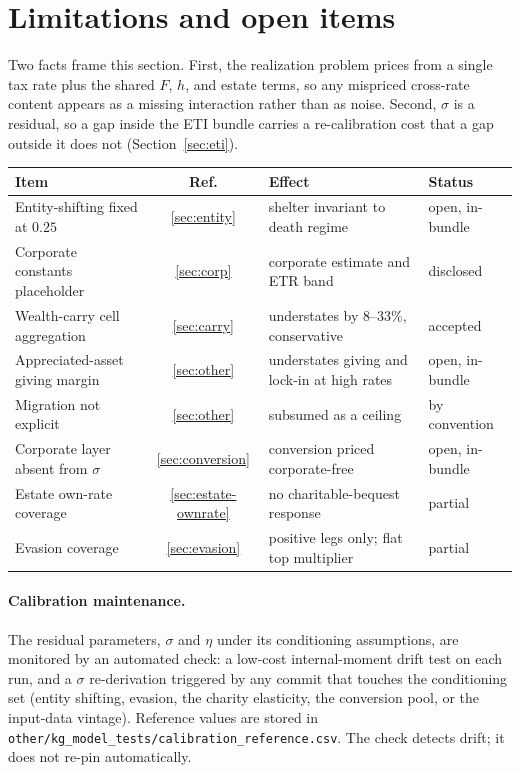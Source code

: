 \documentclass[11pt]{article}
\newcommand{\code}[1]{\texttt{\small #1}}
\begin{document}
\section{Limitations and open items}
\label{sec:limitations}

Two facts frame this section. First, the realization problem prices from a single
tax rate plus the shared $F$, $h$, and estate terms, so any mispriced cross-rate
content appears as a missing interaction rather than as noise. Second, $\sigma$
is a residual, so a gap inside the ETI bundle carries a re-calibration cost that
a gap outside it does not (Section~\ref{sec:eti}).

\begin{table}[h]
\centering\small
\begin{tabular}{@{}p{}cp{}l@{}}
\toprule
Item & Ref. & Effect & Status \\
\midrule
Entity-shifting fixed at $0.25$ & \ref{sec:entity} & shelter invariant to death regime & open, in-bundle \\
Corporate constants placeholder & \ref{sec:corp} & corporate estimate and ETR band & disclosed \\
Wealth-carry cell aggregation & \ref{sec:carry} & understates by 8--33\%, conservative & accepted \\
Appreciated-asset giving margin & \ref{sec:other} & understates giving and lock-in at high rates & open, in-bundle \\
Migration not explicit & \ref{sec:other} & subsumed as a ceiling & by convention \\
Corporate layer absent from $\sigma$ & \ref{sec:conversion} & conversion priced corporate-free & open, in-bundle \\
Estate own-rate coverage & \ref{sec:estate-ownrate} & no charitable-bequest response & partial \\
Evasion coverage & \ref{sec:evasion} & positive legs only; flat top multiplier & partial \\
\bottomrule
\end{tabular}
\end{table}

\paragraph{Calibration maintenance.}
The residual parameters, $\sigma$ and $\eta$ under its conditioning assumptions,
are monitored by an automated check: a low-cost internal-moment drift test on
each run, and a $\sigma$ re-derivation triggered by any commit that touches the
conditioning set (entity shifting, evasion, the charity elasticity, the
conversion pool, or the input-data vintage). Reference values are stored in
\code{other/kg_model_tests/calibration_reference.csv}. The check detects drift;
it does not re-pin automatically.
\end{document}
